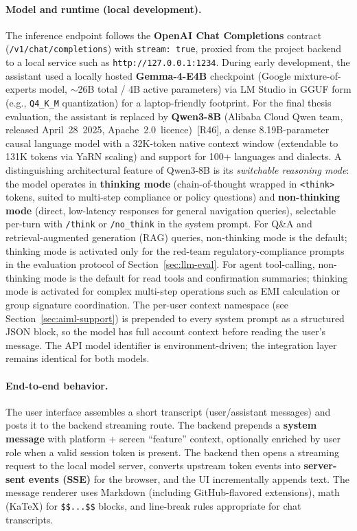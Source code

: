 \documentclass[12pt,a4paper]{report}
\begin{document}
\paragraph{Model and runtime (local development).}
The inference endpoint follows the \textbf{OpenAI Chat Completions} contract (\texttt{/v1/chat/completions}) with \texttt{stream: true}, proxied from the project backend to a local service such as \texttt{http://127.0.0.1:1234}. During early development, the assistant used a locally hosted \textbf{Gemma-4-E4B} checkpoint (Google mixture-of-experts model, $\sim$26B total / 4B active parameters) via LM Studio in GGUF form (e.g., \texttt{Q4\_K\_M} quantization) for a laptop-friendly footprint. For the final thesis evaluation, the assistant is replaced by \textbf{Qwen3-8B} (Alibaba Cloud Qwen team, released April~28~2025, Apache~2.0~licence)~[R46], a dense 8.19B-parameter causal language model with a 32K-token native context window (extendable to 131K tokens via YaRN scaling) and support for 100+ languages and dialects. A distinguishing architectural feature of Qwen3-8B is its \emph{switchable reasoning mode}: the model operates in \textbf{thinking mode} (chain-of-thought wrapped in \texttt{<think>} tokens, suited to multi-step compliance or policy questions) and \textbf{non-thinking mode} (direct, low-latency responses for general navigation queries), selectable per-turn with \texttt{/think} or \texttt{/no\_think} in the system prompt. For Q\&A and retrieval-augmented generation (RAG) queries, non-thinking mode is the default; thinking mode is activated only for the red-team regulatory-compliance prompts in the evaluation protocol of Section~\ref{sec:llm-eval}. For agent tool-calling, non-thinking mode is the default for read tools and confirmation summaries; thinking mode is activated for complex multi-step operations such as EMI calculation or group signature coordination. The per-user context namespace (see Section~\ref{sec:aiml-support}) is prepended to every system prompt as a structured JSON block, so the model has full account context before reading the user's message. The API model identifier is environment-driven; the integration layer remains identical for both models.

\paragraph{End-to-end behavior.}
The user interface assembles a short transcript (user/assistant messages) and posts it to the backend streaming route. The backend prepends a \textbf{system message} with platform + screen ``feature'' context, optionally enriched by user role when a valid session token is present. The backend then opens a streaming request to the local model server, converts upstream token events into \textbf{server-sent events (SSE)} for the browser, and the UI incrementally appends text. The message renderer uses Markdown (including GitHub-flavored extensions), math (KaTeX) for \texttt{\$\$...\$\$} blocks, and line-break rules appropriate for chat transcripts.
\end{document}
